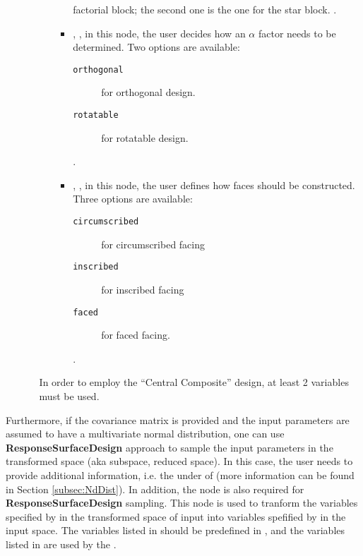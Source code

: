 \begin{itemize}
\begin{itemize}
\begin{itemize}
\begin{itemize}
        factorial block; the second one is the one for the star block.
        .
      \item {}, , in this node,
        the user decides how an $\alpha$ factor needs to be determined.
        Two options are available:
        \begin{description}
          \item[\texttt{orthogonal}] for orthogonal design.
          \item[\texttt{rotatable}] for rotatable design.
        \end{description}
        .
      \item {}, , in this node,
        the user defines how faces should be constructed.
        Three options are available:
        \begin{description}
          \item[\texttt{circumscribed}] for circumscribed facing
          \item[\texttt{inscribed}] for inscribed facing
          \item[\texttt{faced}] for faced facing.
        \end{description}
        .
     \end{itemize}
  \end{itemize}
  \nb In order to employ the ``Central Composite'' design, at least 2
  variables must be used.
\end{itemize}
\end{itemize}

Furthermore, if the covariance matrix is provided and the input parameters are assumed to have a multivariate normal distribution, one can use
\textbf{ResponseSurfaceDesign} approach to sample the input parameters in the transformed space (aka subspace, reduced space).
In this case, the user needs to provide additional information, i.e. the  under  of 
(more information can be found in Section \ref{subsec:NdDist}). In addition, the node  is also
required for \textbf{ResponseSurfaceDesign} sampling. This node is used to tranform the variables specified by  in the
transformed space of input into variables spefified by  in the input space. The variables listed
in  should be predefined in , and the variables listed in 
are used by the .

